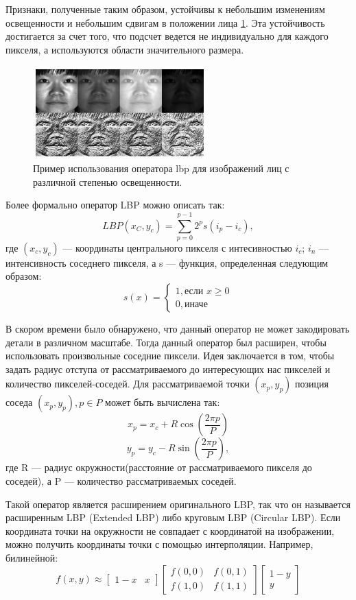 Признаки, полученные таким образом, устойчивы к небольшим изменениям
освещенности и небольшим сдвигам в положении лица \ref{fig:lbp-faces}. Эта
устойчивость достигается за счет того, что подсчет ведется не индивидуально для
каждого пикселя, а используются области значительного размера.

\begin{figure}[h!]  \centering
  \includegraphics[height=.2\textheight]{lbp-faces.png}
    \captionsetup{justification=centering}
  \caption{Пример использования оператора lbp для изображений лиц с различной
степенью освещенности.}
  \label{fig:lbp-faces}
\end{figure}

Более формально оператор LBP можно описать так:
\[ LBP(x_C,y_c) = \sum_{p=0}^{p-1}2^ps(i_p-i_c),\] где $(x_c,y_c)$ ---
координаты центрального пикселя с интесивностью $i_c$; $i_n$ --- интенсивность
соседнего пикселя, а s --- функция, определенная следующим образом:
\[ s(x) = \begin{cases} 1, \mbox{если $x \geq 0$} \\ 0, \mbox{иначе}
          \end{cases}
\]

В скором времени было обнаружено, что данный оператор не может закодировать
детали в различном масштабе. Тогда данный оператор был расширен, чтобы
использовать произвольные соседние пиксели. Идея заключается в том, чтобы задать
радиус отступа от рассматриваемого до интересующих нас пикселей и количество
пикселей-соседей. Для рассматриваемой точки $(x_p,y_p)$ позиция соседа
$(x_p,y_p),p \in P$ может быть вычислена так:
\[ x_p = x_c + R\cos(\frac{2\pi p}{P}) \]
\[ y_p = y_c - R\sin(\frac{2\pi p}{P}), \] где R --- радиус
окружности(расстояние от рассматриваемого пикселя до соседей), а P ---
количество рассматриваемых соседей.


Такой оператор является расширением оригинального LBP, так что он называется
расширенным LBP (Extended LBP) либо круговым LBP (Circular LBP). Если координата
точки на окружности не совпадает с координатой на изображении, можно получить
координаты точки с помощью интерполяции. Например, билинейной:
$$ f(x,y) \approx 
\begin{bmatrix} 1 - x & x
\end{bmatrix}
\begin{bmatrix} f(0,0) & f(0,1) \\ f(1,0) & f(1,1)
\end{bmatrix}
\begin{bmatrix} 1 - y \\ y
\end{bmatrix}
$$



